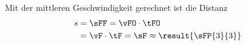 Mit der mittleren Geschwindigkeit gerechnet ist die Distanz
\begin{align}
 s &= \sFF = \vFO\cdot\tFO \\
   &= \vF\cdot\tF = \sF \approx \result{\sFP{3}{3}}
\end{align}

